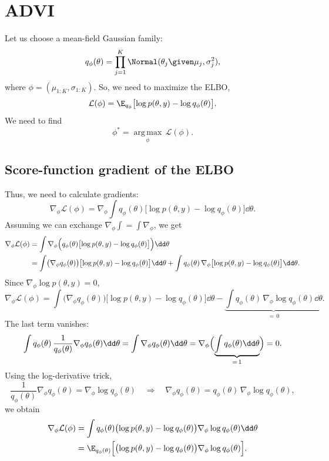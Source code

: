 \section{ADVI}
Let us choose a mean-field Gaussian family:
\[
q_\phi(\theta) = \prod_{j=1}^{K}\Normal(\theta_j \given \mu_j, \sigma_j^2),
\]
where $\phi = (\mu_{1:K}, \sigma_{1:K})$. So, we need to maximize the ELBO,
\[
\mathcal{L}(\phi) = \E_{q_\phi}\bigl[\log p(\theta, y) - \log q_\phi(\theta)\bigr].
\]
We need to find
\[
\phi^* = \operatorname*{arg\,max}_\phi\, \mathcal{L}(\phi).
\]

\subsection{Score-function gradient of the ELBO}
Thus, we need to calculate gradients:
\[
\nabla_\phi\mathcal{L}(\phi) = \nabla_\phi\int q_\phi(\theta)\bigl[\log p(\theta, y) - \log q_\phi(\theta)\bigr]\dd\theta.
\]
Assuming we can exchange $\nabla_\phi\int = \int\nabla_\phi$, we get
\begin{align*}
\nabla_\phi\mathcal{L}(\phi) &= \int \nabla_\phi\Bigl(q_\phi(\theta)\bigl[\log p(\theta, y) - \log q_\phi(\theta)\bigr]\Bigr)\dd\theta \\
&= \int \bigl(\nabla_\phi q_\phi(\theta)\bigr)\bigl[\log p(\theta, y) - \log q_\phi(\theta)\bigr]\dd\theta
 + \int q_\phi(\theta)\,\nabla_\phi\bigl[\log p(\theta, y) - \log q_\phi(\theta)\bigr]\dd\theta.
\end{align*}
Since $\nabla_\phi\log p(\theta, y) = 0$,
\[
\nabla_\phi\mathcal{L}(\phi) = \int \bigl(\nabla_\phi q_\phi(\theta)\bigr)\bigl[\log p(\theta, y) - \log q_\phi(\theta)\bigr]\dd\theta
 - \underbrace{\int q_\phi(\theta)\,\nabla_\phi\log q_\phi(\theta)\dd\theta}_{=\,0}.
\]
The last term vanishes:
\[
\int q_\phi(\theta)\,\frac{1}{q_\phi(\theta)}\nabla_\phi q_\phi(\theta)\dd\theta
= \int \nabla_\phi q_\phi(\theta)\dd\theta
= \nabla_\phi\Bigl(\underbrace{\int q_\phi(\theta)\dd\theta}_{=\,1}\Bigr) = 0.
\]
Using the log-derivative trick,
\[
\frac{1}{q_\phi(\theta)}\nabla_\phi q_\phi(\theta) = \nabla_\phi\log q_\phi(\theta)
\quad\Longrightarrow\quad
\nabla_\phi q_\phi(\theta) = q_\phi(\theta)\,\nabla_\phi\log q_\phi(\theta),
\]
we obtain
\begin{align*}
\nabla_\phi\mathcal{L}(\phi) &= \int q_\phi(\theta)\bigl(\log p(\theta, y) - \log q_\phi(\theta)\bigr)\nabla_\phi\log q_\phi(\theta)\dd\theta \\
&= \E_{q_\phi(\theta)}\Bigl[\bigl(\log p(\theta, y) - \log q_\phi(\theta)\bigr)\nabla_\phi\log q_\phi(\theta)\Bigr].
\end{align*}

